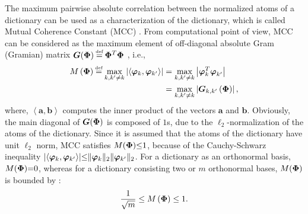 The maximum pairwise absolute correlation between the normalized atoms of a dictionary can be used as a characterization of the dictionary, which is called Mutual Coherence Constant (MCC) \cite{Donoho2001}.
From computational point of view, MCC can be considered as the maximum element of off-diagonal absolute Gram (Gramian) matrix $\boldsymbol{G}(\myPhi) \myeq \myPhi^T\myPhi$ \cite{Donoho2003,Donoho2003a}, i.e.,
\begin{equation*}
\begin{aligned}
\label{eq:MIC}
M\myparanthese{\myPhi} \myeq 
\max_{k,k' \neq k} \myabs{ \left\langle \boldsymbol{\varphi}_k , \boldsymbol{\varphi}_{k'} \right\rangle}
&= \max_{k,k' \neq k} \myabs{\boldsymbol{\varphi}^T_k \boldsymbol{\varphi}^{ }_{k'}} \\
&= \max_{k,k' \neq k} \myabs{\boldsymbol{G}_{k,k'}\myparanthese{\myPhi}},
\end{aligned}
\end{equation*}
where, $\left\langle \boldsymbol{a} , \boldsymbol{b} \right\rangle$ computes the inner product of the vectors $\boldsymbol{a}$ and $\boldsymbol{b}$.
Obviously, the main diagonal of $\boldsymbol{G}(\boldsymbol{\Phi})$ is composed of $1$s, due to the $\ell_2$-normalization of the atoms of the dictionary.
Since it is assumed that the atoms of the dictionary have unit $\ell_2$ norm, MCC satisfies $M(\boldsymbol{\Phi}) {\leq} 1$, because of the Cauchy-Schwarz inequality $\vert \langle \boldsymbol{\varphi}_k , \boldsymbol{\varphi}_{k'} \rangle \vert {\leq} \Vert \boldsymbol{\varphi}_k \Vert_2  \Vert\boldsymbol{\varphi}_{k'} \Vert_2 $.
For a dictionary as an orthonormal basis, $M(\boldsymbol{\Phi}) {=} 0$, whereas for a dictionary consisting two or $m$ orthonormal bases, $M(\boldsymbol{\Phi})$ is bounded by \cite{Heath2006}:
\begin{equation}
\label{eq:M-bounds}
\frac{1}{\sqrt{m}} \leq M\left( \boldsymbol{\Phi} \right) \leq 1.
\end{equation}

